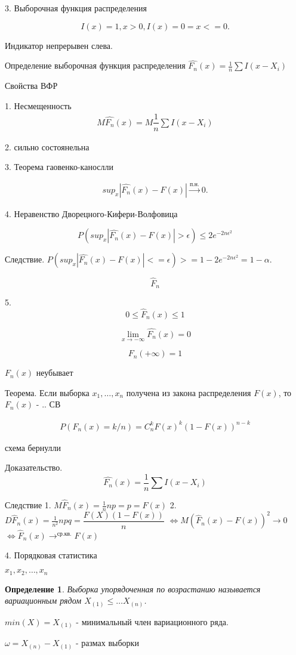 \documentclass[12pt, oneside]{book}
\newtheorem{definition}{Определение}[section]
\newcommand{\toPN}{\xrightarrow[]{\text{п.н.}}} %
\begin{document}
  3. Выборочная функция распределения

  \[
    I(x) = 1, x>0, I(x) = 0 = x<=0.
  \]

  Индикатор непрерывен слева.

  Определение выборочная функция распределения $\hat{F_n} (x) = \frac{1}{n} \sum I(x-X_i)$

  Свойства ВФР

  1. Несмещенность
  \begin{multline*}
    M \hat{F_n} (x) = M \dfrac{1}{n} \sum I(x-X_i)
  \end{multline*}

  2. сильно состоянельна

  3.  Теорема гаовенко-канослли

  \begin{multline*}
    sup_x |\hat{F_n} (x) - F(x)| \toPN 0.
  \end{multline*}

  4. Неравенство Дворецного-Кифери-Волфовица

  $$P(sup_x |\hat{F_n}(x) - F(x)| > \epsilon) \leqslant 2 e^{-2n \epsilon^2}$$

  Следствие. $P\left(sup_x |\hat{F_n} (x) - F(x)| <= \epsilon\right) >= 1 - 2 e^{-2n \epsilon^2} = 1-\alpha$.

  $$\hat F_n$$

  5. $$0 \leqslant \hat F_n (x) \leqslant 1$$

  $$\lim_{x\to -\infty} \hat{F_n} (x) = 0$$
  
  $$F_n(+\infty) = 1$$

  $F_n(x)$ неубывает
  
  Теорема. Если выборка $x_1, \dots, x_n$ получена из закона распределения $F(x)$, то $F_n(x)$ - .. СВ

  \begin{multline*}
    P(F_n(x) = k/n) = C_n^k F(x)^k (1-F(x))^{n-k}
  \end{multline*}

  схема бернулли

  Доказательство. 
  \[
    \hat{F_n} \left(x\right) = \frac{1}{n} \sum I\left(x-X_i\right)
  \]

  Следствие
  1. $M \hat F_n (x) = \frac{1}{n} np = p = F(x)$
  2. $D \hat F_n (x) = \frac{1}{n^2} npq = \dfrac{F(X) (1 - F(x))}{n}$
  $\Leftrightarrow M (\hat F_n(x) - F(x))^2 \to 0$
  $\Leftrightarrow \hat F_n (x) \to^\text{ср.кв.} F(x)$

  4. Порядковая статистика

  $x_1, x_2, \dots, x_n$

  \begin{definition}
    Выборка упорядоченная по возрастанию называется вариационным рядом $X_{(1)} \leqslant \dots X_{(n)}$.
  \end{definition}

  $min (X) = X_{(1)}$ - минимальный член вариационного ряда.

  $\omega = X_{(n)} - X_{(1)}$ - размах выборки
\end{document}
